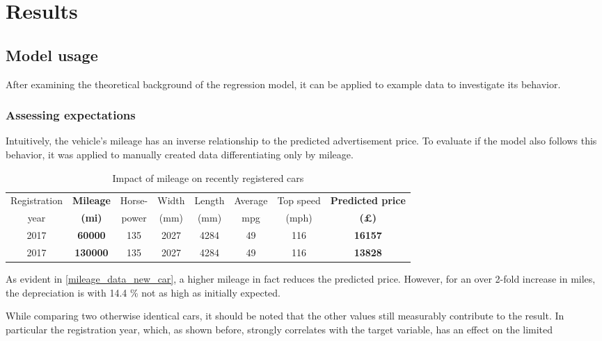 \chapter{Results}
\section{Model usage}\label{model_usage_section}
After examining the theoretical background of the regression model, it can be applied to example data to investigate its behavior.
\subsection{Assessing expectations}
Intuitively, the vehicle's mileage has an inverse relationship to the predicted advertisement price.
To evaluate if the model also follows this behavior, it was applied to manually created data differentiating only by mileage.
\begin{table}[H]
    \begin{adjustbox}{width={\textwidth}}
        \begin{tabular}{|c|c|c|c|c|c|c|c|}
            \hline
            Registration & \textbf{Mileage} & Horse- & Width & Length & Average & Top speed & \textbf{Predicted price} \\[-1ex]
            year         & \textbf{(mi)}    & power  & (mm)  & (mm)   & mpg     & (mph)     & \textbf{(£)}             \\ \hline
            2017         & \textbf{60000}   & 135    & 2027  & 4284   & 49      & 116       & \textbf{16157}           \\\hline
            2017         & \textbf{130000}  & 135    & 2027  & 4284   & 49      & 116       & \textbf{13828}           \\\hline
        \end{tabular}
    \end{adjustbox}
    \caption{Impact of mileage on recently registered cars}
    \label{mileage_data_new_car}
\end{table}
As evident in \autoref{mileage_data_new_car}, a higher mileage in fact reduces the predicted price.
However, for an over 2-fold increase in miles, the depreciation is with 14.4 \% not as high as initially expected.
\par
While comparing two otherwise identical cars, it should be noted that the other values still measurably contribute to the
result.
\newline
In particular the registration year, which, as shown before, strongly correlates with the target variable, has an effect on the limited
